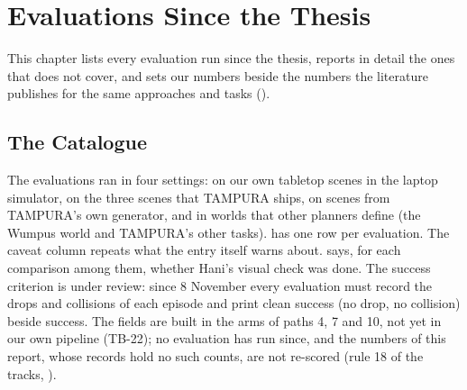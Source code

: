 
\chapter{Evaluations Since the Thesis}
\label{ch:evaluations}

This chapter lists every evaluation run since the thesis, reports in detail the
ones that  does not cover, and sets our numbers beside the
numbers the literature publishes for the same approaches and tasks
().

\section{The Catalogue}
\label{sec:catalogue}

The evaluations ran in four settings: on our own tabletop scenes in the laptop
simulator, on the three scenes that TAMPURA ships, on scenes from TAMPURA's own
generator, and in worlds that other planners define (the Wumpus world and TAMPURA's
other tasks).  has one row per evaluation. The caveat column
repeats what the entry itself warns about.  says, for each
comparison among them, whether Hani's visual check was done. The success criterion is
under review: since 8 November every evaluation must record the drops and collisions of each
episode and print clean success (no drop, no collision) beside success. The fields are built in the arms of paths 4, 7 and 10, not yet in our own pipeline (TB-22); no evaluation has run since, and the numbers
of this report, whose records hold no such counts, are not re-scored (rule 18 of the
tracks, ).

